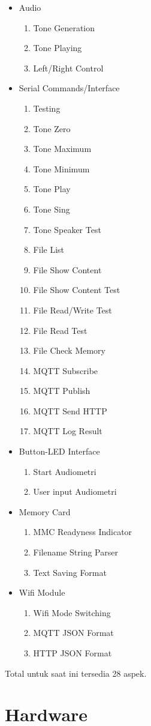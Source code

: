 \documentclass[12pt,]{article}
\begin{document}
	\begin{itemize}
		\item Audio
		\begin{enumerate}
			\item Tone Generation
			\item Tone Playing
			\item Left/Right Control
		\end{enumerate}
	
		\item Serial Commands/Interface
		\begin{enumerate}
			\item Testing
			\item Tone Zero
			\item Tone Maximum
			\item Tone Minimum
			\item Tone Play 
			\item Tone Sing
			\item Tone Speaker Test
			\item File List
			\item File Show Content
			\item File Show Content Test
			\item File Read/Write Test
			\item File Read Test
			\item File Check Memory
			\item MQTT Subscribe
			\item MQTT Publish
			\item MQTT Send HTTP
			\item MQTT Log Result
		\end{enumerate}
	
		\item Button-LED Interface
		\begin{enumerate}
			\item Start Audiometri
			\item User input Audiometri
		\end{enumerate}
	
		\item Memory Card
		\begin{enumerate}
			\item MMC Readyness Indicator
			\item Filename String Parser
			\item Text Saving Format
		\end{enumerate}
	
		\item Wifi Module
		\begin{enumerate}
			\item Wifi Mode Switching
			\item MQTT JSON Format
			\item HTTP JSON Format
		\end{enumerate}
	\end{itemize}

	Total untuk saat ini tersedia 28 aspek.

	\newpage
	\section{Hardware}
\end{document}
